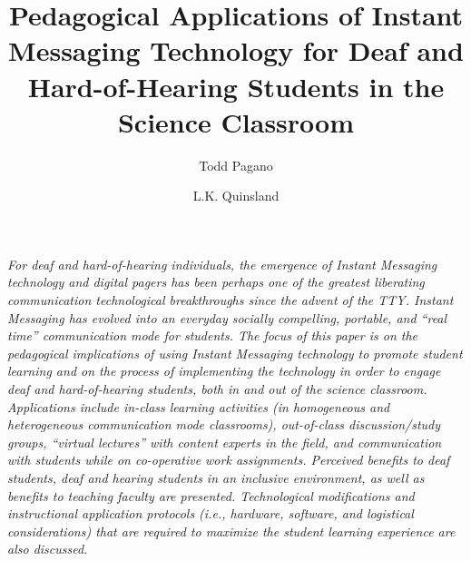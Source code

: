 \documentclass[11.5pt]{sig-alternate} %
\makeatletter
\let\oldabstract\abstract
\let\oldendabstract\endabstract
\renewenvironment{abstract} %
{\renewenvironment{quotation}%
               {\list{}{\addtolength{\leftmargin}{1em} %
                        \listparindent 1.5em%
                        \itemindent    \listparindent%
                        \rightmargin   \leftmargin%
                        \parsep        \z@ \@plus\p@}%
                \item\relax}%
               {\endlist}%
\oldabstract}
{\oldendabstract}
\makeatother
\begin{document}
\title{Pedagogical Applications of Instant Messaging Technology for Deaf and Hard-of-Hearing Students in the Science Classroom}

\author[1]{\large \color{blue}Todd Pagano}
\author[1]{\large \color{blue}L.K. Quinsland}


\toappear{}
\maketitle
\begin{@twocolumnfalse} 
\begin{abstract}
\item 
\textit{For deaf and hard-of-hearing individuals, the emergence of Instant Messaging technology and digital pagers has been perhaps one of the greatest liberating communication technological breakthroughs since the advent of the TTY.  Instant Messaging has evolved into an everyday socially compelling, portable, and “real time” communication mode for students.  The focus of this paper is on the pedagogical implications of using Instant Messaging technology to promote student learning and on the process of implementing the technology in order to engage deaf and hard-of-hearing students, both in and out of the science classroom.  Applications include in-class learning activities (in homogeneous and heterogeneous communication mode classrooms), out-of-class discussion/study groups, “virtual lectures” with content experts in the field, and communication with students while on co-operative work assignments.  Perceived benefits to deaf students, deaf and hearing students in an inclusive environment, as well as benefits to teaching faculty are presented.  Technological modifications and instructional application protocols (i.e., hardware, software, and logistical considerations) that are required to maximize the student learning experience are also discussed. }
\\ \\
\end{abstract}
\end{@twocolumnfalse}

\end{document}
